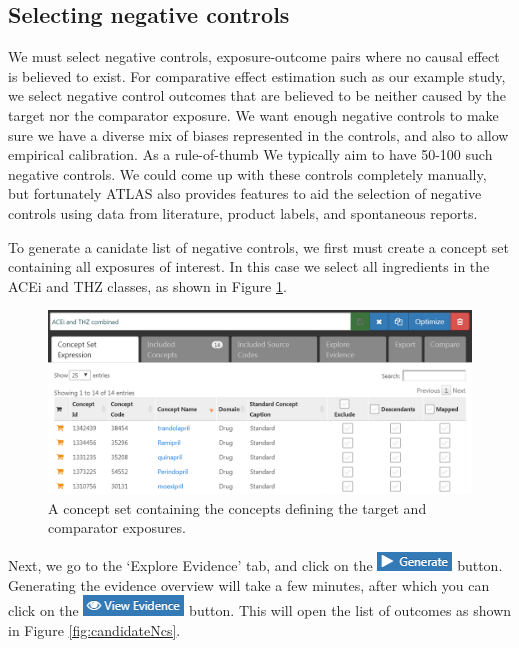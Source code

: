 \documentclass[11pt]{book}
\begin{document}
\subsection{Selecting negative
controls}\label{selecting-negative-controls}

We must select negative controls, exposure-outcome pairs where no causal
effect is believed to exist. For comparative effect estimation such as
our example study, we select negative control outcomes that are believed
to be neither caused by the target nor the comparator exposure. We want
enough negative controls to make sure we have a diverse mix of biases
represented in the controls, and also to allow empirical calibration. As
a rule-of-thumb We typically aim to have 50-100 such negative controls.
We could come up with these controls completely manually, but
fortunately ATLAS also provides features to aid the selection of
negative controls using data from literature, product labels, and
spontaneous reports.

To generate a canidate list of negative controls, we first must create a
concept set containing all exposures of interest. In this case we select
all ingredients in the ACEi and THZ classes, as shown in Figure
\ref{fig:exposuresConceptSet}.

\begin{figure}

{\centering \includegraphics[width=1\linewidth]{images/MethodValidity/exposuresConceptSet} 

}

\caption{A concept set containing the concepts defining the target and comparator exposures.}\label{fig:exposuresConceptSet}
\end{figure}

Next, we go to the `Explore Evidence' tab, and click on the
\includegraphics{images/MethodValidity/generate.png} button. Generating
the evidence overview will take a few minutes, after which you can click
on the \includegraphics{images/MethodValidity/viewEvidence.png} button.
This will open the list of outcomes as shown in Figure
\ref{fig:candidateNcs}.
\end{document}
